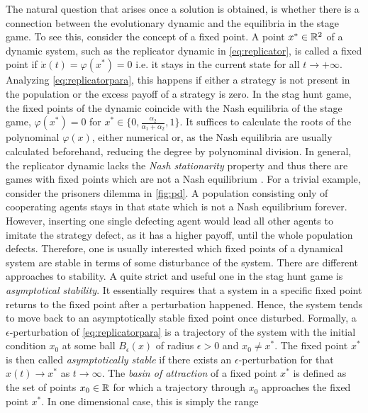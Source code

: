 The natural question that arises once a solution is obtained, is whether there 
is a connection between the evolutionary dynamic and the equilibria in the 
stage game. To see this, consider the concept of a fixed point.
A point $x^* \in \mathbb{R}^2$ of a dynamic system, such as the replicator 
dynamic in \eqref{eq:replicator}, is called a fixed point
if $\dot{x}(t) = \varphi(x^*) = 0$ i.e. it stays in the current state for all 
$t \rightarrow + \infty $. 
Analyzing \eqref{eq:replicatorpara}, this happens if either a strategy
is not present in the population or the excess payoff of a strategy is zero. 
In the stag hunt game, the fixed points of the
dynamic coincide with the Nash equilibria of the stage game, 
$\varphi(x^*) = 0$ for $x^* \in \{0,\frac{\alpha_2}{\alpha_1+\alpha_2},1\}$. 
It suffices to calculate the roots of the polynominal $\varphi(x)$, either
numerical or, as the Nash equilibria are usually calculated beforehand,
reducing the degree by polynominal division. In general, the replicator 
dynamic lacks the \textit{Nash stationarity} property and thus there are 
games with fixed points which are not a Nash equilibrium
\parencite{sandholm_population_2010}.
For a trivial example, consider the prisoners dilemma in \ref{fig:pd}. 
A population consisting only of cooperating agents stays in that state
which is not a Nash equilibrium forever. However, inserting one single 
defecting agent would lead all other agents to imitate the strategy defect,
as it has a higher payoff, until the whole population defects.
Therefore, one is usually interested which fixed points of 
a dynamical system are stable in terms of some disturbance of the system. 
There are different approaches to stability. A quite strict and useful one 
in the stag hunt game is \textit{asymptotical stability}. 
It essentially requires that a system in a specific fixed point returns 
to the fixed point after a perturbation happened.
Hence, the system tends to move back to an asymptotically stable fixed point
once disturbed. Formally, a $\epsilon$-perturbation of 
\eqref{eq:replicatorpara} is a trajectory of the system with the initial
condition $x_0$ at some ball $B_\epsilon(x)$ of radius $\epsilon >0$ and 
$x_0 \neq x^*$. The fixed point $x^*$ is then called \textit{asymptotically
stable} if there exists an $\epsilon$-perturbation for that $x(t) \rightarrow
x^*$ as $t \rightarrow \infty$. 
The \textit{basin of attraction} of a fixed point $x^*$ is defined as the set 
of points $x_0 \in \mathbb{R}$ for which a trajectory through $x_0$ approaches 
the fixed point $x^*$. In one dimensional case, this is simply the range 
